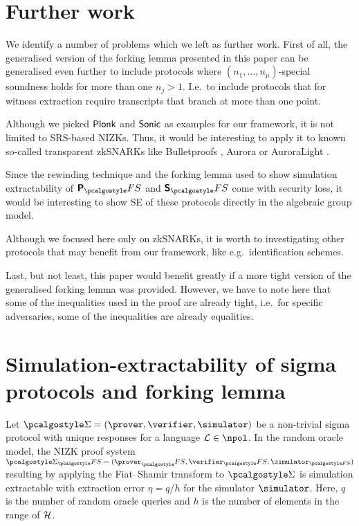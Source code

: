 \documentclass[runningheads,11pt]{llncs}
\theoremstyle{definition} \newtheorem{definition}[theorem]{Definition}
\begin{document}
\section{Further work}
We identify a number of problems which we left as further work. First of all,
the generalised version of the forking lemma presented in this paper can be
generalised even further to include protocols where $(n_1, \ldots,
n_\mu)$-special soundness holds for more than one $n_j > 1$. I.e.~to include
protocols that for witness extraction require transcripts that branch at more
than one point.

Although we picked $\textnormal{\textsf{Plonk}}$ and ${\textnormal{\textsf{Sonic}}}$ as examples for our framework, it is
not limited to SRS-based NIZKs. Thus, it would be interesting to apply it to
known so-called transparent zkSNARKs like Bulletproofs \cite{SP:BBBPWM18},
Aurora \cite{EC:BCRSVW19} or AuroraLight \cite{EPRINT:Gabizon19a}.

Since the rewinding technique and the forking lemma used to show simulation
extractability of $\plonkprotfs$ and $\sonicprotfs$ come with security loss,
it would be interesting to show SE of these protocols directly in the
algebraic group model.

Although we focused here only on zkSNARKs, it is worth to
investigating other protocols that may benefit from our framework, like
e.g.~identification schemes.

Last, but not least, this paper would benefit greatly if a more tight version
of the generalised forking lemma was provided. However, we have to note here
that some of the inequalities used in the proof are already tight, i.e.~for
specific adversaries, some of the inequalities are already equalities.


\appendix

\section{Simulation-extractability of sigma protocols and forking lemma}
\label{sec:forking_lemma}
\begin{theorem}
	Let $\sigmaprot = (\prover, \verifier, \simulator)$ be a non-trivial sigma
  protocol with unique responses for a language $\LANG \in \npol$. In the random
  oracle model, the NIZK proof system $\sigmaprot_\fs = (\prover_\fs,
  \verifier_\fs, \simulator_{\fs})$ resulting by applying the Fiat--Shamir
  transform to $\sigmaprot$ is simulation extractable with extraction error
  $\eta = q/h$ for the simulator $\simulator$. Here, $q$ is the number of random
  oracle queries and $h$ is the number of elements in the range of $\mathcal{H}$.
\end{theorem}
\end{document}
